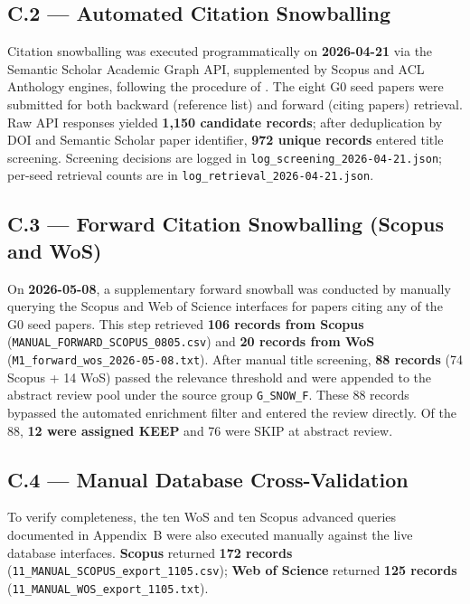 \subsection*{C.2 — Automated Citation Snowballing}
\label{app:search_log:snowball}

Citation snowballing was executed programmatically on \textbf{2026-04-21} via the
Semantic Scholar Academic Graph API, supplemented by Scopus and ACL Anthology engines,
following the procedure of \citet{Wohlin2014}. The eight G0 seed papers were submitted
for both backward (reference list) and forward (citing papers) retrieval. Raw API
responses yielded \textbf{1,150 candidate records}; after deduplication by DOI and
Semantic Scholar paper identifier, \textbf{972 unique records} entered title screening.
Screening decisions are logged in \texttt{log\_screening\_2026-04-21.json}; per-seed
retrieval counts are in \texttt{log\_retrieval\_2026-04-21.json}.

\subsection*{C.3 — Forward Citation Snowballing (Scopus and WoS)}
\label{app:search_log:forward}

On \textbf{2026-05-08}, a supplementary forward snowball was conducted by manually
querying the Scopus and Web of Science interfaces for papers citing any of the G0 seed
papers. This step retrieved \textbf{106 records from Scopus}
(\texttt{MANUAL\_FORWARD\_SCOPUS\_0805.csv}) and \textbf{20 records from WoS}
(\texttt{M1\_forward\_wos\_2026-05-08.txt}). After manual title screening, \textbf{88
records} (74 Scopus + 14 WoS) passed the relevance threshold and were appended to the
abstract review pool under the source group \texttt{G\_SNOW\_F}. These 88 records
bypassed the automated enrichment filter and entered the review directly. Of the 88,
\textbf{12 were assigned KEEP} and 76 were SKIP at abstract review.

\subsection*{C.4 — Manual Database Cross-Validation}
\label{app:search_log:crossval}

To verify completeness, the ten WoS and ten Scopus advanced queries documented in
Appendix~B were also executed manually against the live database interfaces.
\textbf{Scopus} returned \textbf{172 records}
(\texttt{11\_MANUAL\_SCOPUS\_export\_1105.csv}); \textbf{Web of Science} returned
\textbf{125 records} (\texttt{11\_MANUAL\_WOS\_export\_1105.txt}).

